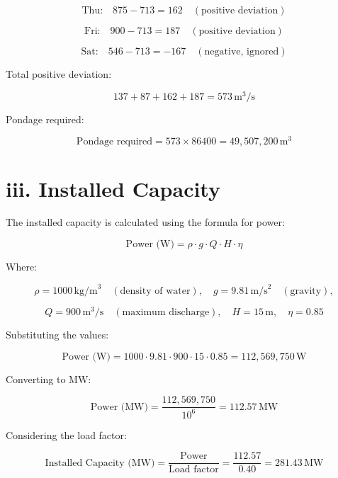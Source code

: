 \documentclass[12pt]{article}
\begin{document}
	\[
	\text{Thu:} \quad 875 - 713 = 162 \quad (\text{positive deviation})
	\]
	
	\[
	\text{Fri:} \quad 900 - 713 = 187 \quad (\text{positive deviation})
	\]
	
	\[
	\text{Sat:} \quad 546 - 713 = -167 \quad (\text{negative, ignored})
	\]
	
	Total positive deviation:
	
	\[
	137 + 87 + 162 + 187 = 573 \, \text{m}^3/\text{s}
	\]
	
	Pondage required:
	
	\[
	\text{Pondage required} = 573 \times 86400 = 49,507,200 \, \text{m}^3
	\]
	
	\section*{iii. Installed Capacity}
	
	The installed capacity is calculated using the formula for power:
	
	\[
	\text{Power (W)} = \rho \cdot g \cdot Q \cdot H \cdot \eta
	\]
	
	Where:
	
	\[
	\rho = 1000 \, \text{kg/m}^3 \quad (\text{density of water}), \quad g = 9.81 \, \text{m/s}^2 \quad (\text{gravity}),
	\]
	
	\[
	Q = 900 \, \text{m}^3/\text{s} \quad (\text{maximum discharge}), \quad H = 15 \, \text{m}, \quad \eta = 0.85
	\]
	
	Substituting the values:
	
	\[
	\text{Power (W)} = 1000 \cdot 9.81 \cdot 900 \cdot 15 \cdot 0.85 = 112,569,750 \, \text{W}
	\]
	
	Converting to MW:
	
	\[
	\text{Power (MW)} = \frac{112,569,750}{10^6} = 112.57 \, \text{MW}
	\]
	
	Considering the load factor:
	
	\[
	\text{Installed Capacity (MW)} = \frac{\text{Power}}{\text{Load factor}} = \frac{112.57}{0.40} = 281.43 \, \text{MW}
	\]
\end{document}
